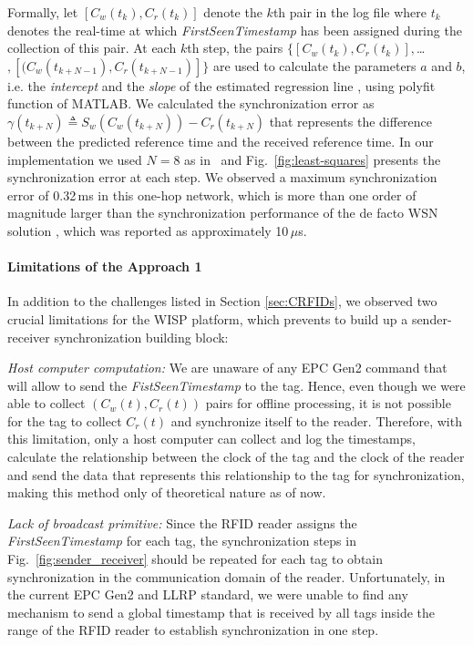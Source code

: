 \documentclass[journal,draftcls,onecolumn,12pt,twoside]{IEEEtranTCOM}
\begin{document}
Formally, let $[C_w(t_k),C_r(t_k)]$ denote the $k$th pair in the log file where $t_k$ denotes the real-time at which 
\emph{FirstSeenTimestamp} has been assigned during the collection of this pair. At each $k$th step, the pairs $\{[C_w(t_k),C_r(t_k)],$\ldots$,[(C_w(t_{k+N-1}),C_r(t_{k+N-1})]\}$ are used to calculate the parameters $a$ and $b$, i.e. the \emph{intercept} and the \emph{slope} of the estimated regression line \cite{book-SheldonRoss}, using \textsf{polyfit} function of MATLAB. We calculated the synchronization error as 
$\gamma(t_{k+N})\triangleq S_w(C_w(t_{k+N}))-C_r(t_{k+N})$
%
that represents the difference between the predicted reference time and the received reference time. In our implementation we used $N=8$ as in~\cite{Maroti2004} and Fig.~\ref{fig:least-squares} presents the synchronization error at each step. We observed a maximum synchronization error of 0.32\,ms in this one-hop network, which is more than one order of magnitude larger than the synchronization performance of the de facto WSN solution \cite{Maroti2004}, which was reported as approximately 10\,$\mu$s.

\paragraph{Limitations of the Approach 1}

In addition to the challenges listed in Section \ref{sec:CRFIDs}, we observed two crucial limitations for the WISP platform, which prevents to build up a sender-receiver synchronization building block:

\emph{Host computer computation:} We are unaware of any EPC Gen2 command that will allow to send the \emph{FistSeenTimestamp} to the tag. Hence, even though we were able to collect $(C_w(t),C_r(t))$ pairs for offline processing, it is not possible for the tag to collect $C_r(t)$ and synchronize itself to the reader. Therefore, with this limitation, only a host computer can collect and log the timestamps, calculate the relationship between the clock of the tag and the clock of the reader and send the data that represents this relationship to the tag for synchronization, making this method only of theoretical nature as of now. 

\emph{Lack of broadcast primitive:} Since the RFID reader assigns the \emph{FirstSeenTimestamp} for each tag, the synchronization steps in Fig.~\ref{fig:sender_receiver} should be repeated for each tag to obtain synchronization in the communication domain of the reader. Unfortunately, in the current EPC Gen2 and LLRP standard, we were unable to find any mechanism to send a global timestamp that is received by all tags inside the range of the RFID reader to establish synchronization in one step.
	
\end{document}
